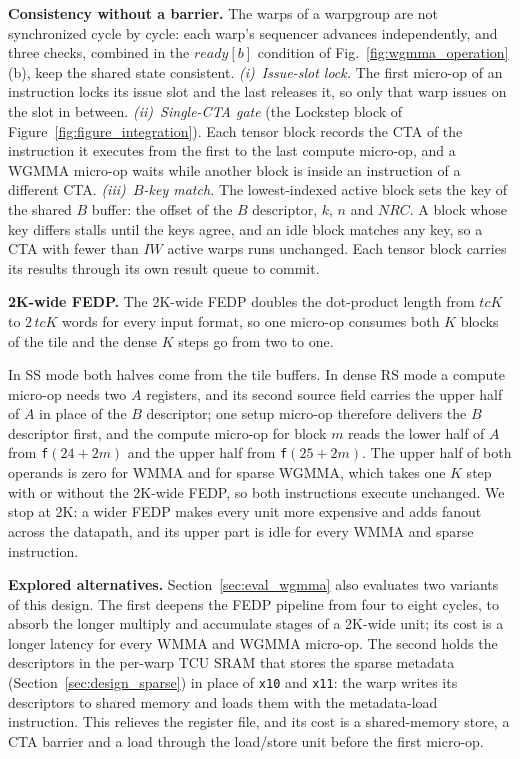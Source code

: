 \textbf{Consistency without a barrier.} The warps of a warpgroup are not synchronized cycle by cycle: each warp's sequencer advances independently, and three checks, combined in the $\mathit{ready}[b]$ condition of Fig.~\ref{fig:wgmma_operation}(b), keep the shared state consistent. \emph{(i)~Issue-slot lock.} The first micro-op of an instruction locks its issue slot and the last releases it, so only that warp issues on the slot in between. \emph{(ii)~Single-CTA gate} (the Lockstep block of Figure~\ref{fig:figure_integration}). Each tensor block records the CTA of the instruction it executes from the first to the last compute micro-op, and a WGMMA micro-op waits while another block is inside an instruction of a different CTA. \emph{(iii)~$B$-key match.} The lowest-indexed active block sets the key of the shared $B$ buffer: the offset of the $B$ descriptor, $k$, $n$ and $\mathit{NRC}$. A block whose key differs stalls until the keys agree, and an idle block matches any key, so a CTA with fewer than $\mathit{IW}$ active warps runs unchanged. Each tensor block carries its results through its own result queue to commit.

\textbf{2K-wide FEDP.} The 2K-wide FEDP doubles the dot-product length from $\mathit{tcK}$ to $2\,\mathit{tcK}$ words for every input format, so one micro-op consumes both $K$ blocks of the tile and the dense $K$ steps go from two to one.

In SS mode both halves come from the tile buffers. In dense RS mode a compute micro-op needs two $A$ registers, and its second source field carries the upper half of $A$ in place of the $B$ descriptor; one setup micro-op therefore delivers the $B$ descriptor first, and the compute micro-op for block $m$ reads the lower half of $A$ from \texttt{f}$(24{+}2m)$ and the upper half from \texttt{f}$(25{+}2m)$. The upper half of both operands is zero for WMMA and for sparse WGMMA, which takes one $K$ step with or without the 2K-wide FEDP, so both instructions execute unchanged. We stop at 2K: a wider FEDP makes every unit more expensive and adds fanout across the datapath, and its upper part is idle for every WMMA and sparse instruction.

\textbf{Explored alternatives.} Section~\ref{sec:eval_wgmma} also evaluates two variants of this design.
The first deepens the FEDP pipeline from four to eight cycles, to absorb the longer multiply and accumulate stages of a 2K-wide unit; its cost is a longer latency for every WMMA and WGMMA micro-op.
The second holds the descriptors in the per-warp TCU SRAM that stores the sparse metadata (Section~\ref{sec:design_sparse}) in place of \texttt{x10} and \texttt{x11}: the warp writes its descriptors to shared memory and loads them with the metadata-load instruction. This relieves the register file, and its cost is a shared-memory store, a CTA barrier and a load through the load/store unit before the first micro-op.

